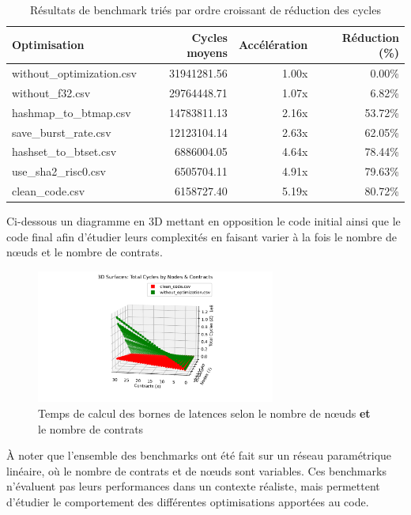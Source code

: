 \documentclass[12pt]{report}
\begin{document}
\begin{table}[h!]
\centering
\begin{tabular}{|l|r|r|r|}
\hline
\textbf{Optimisation} & \textbf{Cycles moyens} & \textbf{Accélération} & \textbf{Réduction (\%)} \\
\hline
without\_optimization.csv & 31941281.56 & 1.00x & 0.00\% \\
without\_f32.csv       & 29764448.71 & 1.07x & 6.82\%  \\
hashmap\_to\_btmap.csv & 14783811.13 & 2.16x & 53.72\% \\
save\_burst\_rate.csv  & 12123104.14 & 2.63x & 62.05\% \\
hashset\_to\_btset.csv &  6886004.05 & 4.64x & 78.44\% \\
use\_sha2\_risc0.csv   &  6505704.11 & 4.91x & 79.63\% \\
clean\_code.csv        &  6158727.40 & 5.19x & 80.72\% \\
\hline
\end{tabular}
\caption{Résultats de benchmark triés par ordre croissant de réduction des cycles}
\end{table}

\smallskip

Ci-dessous un diagramme en 3D mettant en opposition le code initial ainsi
que le code final afin d'étudier leurs complexités en faisant varier
à la fois le nombre de nœuds et le nombre de contrats.

\begin{figure}[H]
    \centering
    \includegraphics[width=0.7\textwidth]{benchmark_3D.pdf}
    \caption{Temps de calcul des bornes de latences selon le nombre de nœuds \textbf{et} le nombre de contrats}
\end{figure}

À noter que l'ensemble des benchmarks ont été fait sur un réseau paramétrique linéaire,
où le nombre de contrats et de nœuds sont variables. Ces benchmarks n'évaluent pas
leurs performances dans un contexte réaliste, mais permettent d'étudier le
comportement des différentes optimisations apportées au code.
\end{document}
